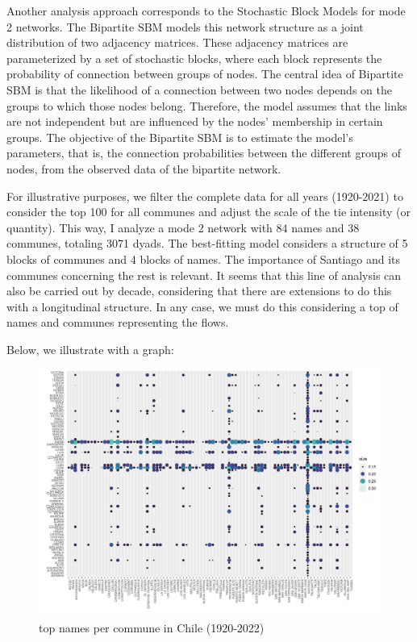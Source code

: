 \begin{enumerate}
Another analysis approach corresponds to the Stochastic Block Models for mode 2 networks. The Bipartite SBM models this network structure as a joint distribution of two adjacency matrices. These adjacency matrices are parameterized by a set of stochastic blocks, where each block represents the probability of connection between groups of nodes. The central idea of Bipartite SBM is that the likelihood of a connection between two nodes depends on the groups to which those nodes belong. Therefore, the model assumes that the links are not independent but are influenced by the nodes' membership in certain groups. The objective of the Bipartite SBM is to estimate the model's parameters, that is, the connection probabilities between the different groups of nodes, from the observed data of the bipartite network.

For illustrative purposes, we filter the complete data for all years (1920-2021) to consider the top 100 for all communes and adjust the scale of the tie intensity (or quantity). This way, I analyze a mode 2 network with 84 names and 38 communes, totaling 3071 dyads. The best-fitting model considers a structure of 5 blocks of communes and 4 blocks of names. The importance of Santiago and its communes concerning the rest is relevant. It seems that this line of analysis can also be carried out by decade, considering that there are extensions to do this with a longitudinal structure. In any case, we must do this considering a top of names and communes representing the flows.

Below, we illustrate with a graph:

\begin{figure}[H]
    \centering
    \includegraphics[width=13cm]{plot/name_commune.png}
    \caption{top names per commune in Chile (1920-2022)}
    \label{}
\end{figure}



\end{enumerate}
